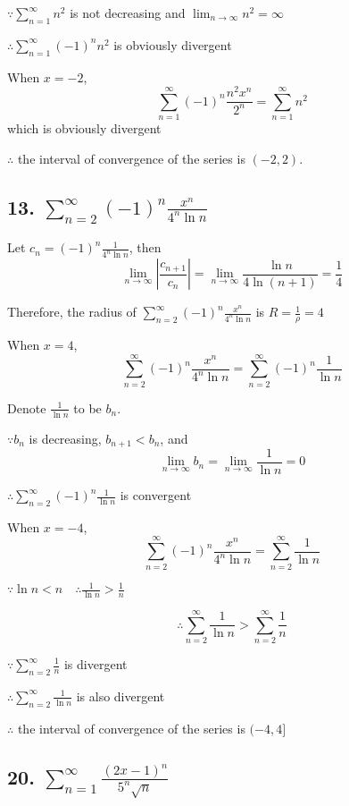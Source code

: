 \documentclass{article}
\begin{document}
    $\because \sum_{n=1}^\infty n^2$ is not decreasing and $\lim_{n\to\infty} n^2 = \infty$

    $\therefore \sum_{n=1}^\infty (-1)^n n^2$ is obviously divergent

    When $x = -2$, $$\sum_{n=1}^\infty (-1)^n \frac{n^2 x^n}{2^n} = \sum_{n=1}^\infty n^2$$ which is obviously divergent

    $\therefore$ the interval of convergence of the series is $(-2, 2)$.

    \subsection*{13. $\sum_{n=2}^\infty (-1)^n \frac{x^n}{4^n \ln n}$}

    Let $c_n = (-1)^n \frac{1}{4^n \ln n}$, then $$\lim_{n\to\infty}| \frac{c_{n+1}}{c_n} | = \lim_{n\to\infty} \frac{\ln n}{4\ln(n+1)} = \frac 1 4$$

    Therefore, the radius of $\sum_{n=2}^\infty (-1)^n \frac{x^n}{4^n \ln n}$ is $R = \frac{1}{\rho} = 4$

    When $x = 4$, $$\sum_{n=2}^\infty (-1)^n \frac{x^n}{4^n \ln n} = \sum_{n=2}^\infty (-1)^n \frac{1}{\ln n}$$

    Denote $\frac{1}{\ln n}$ to be $b_n$.

    $\because b_n$ is decreasing, $b_{n+1} < b_n$, and $$\lim_{n\to\infty}b_n = \lim_{n\to\infty} \frac{1}{\ln n} = 0$$

    $\therefore \sum_{n=2}^\infty (-1)^n \frac{1}{\ln n}$ is convergent

    When $x=-4$, $$\sum_{n=2}^\infty (-1)^n \frac{x^n}{4^n \ln n} = \sum_{n=2}^\infty \frac{1}{\ln n}$$

    $\because \ln n < n \quad \therefore \frac{1}{\ln n} > \frac{1}{n}$

    $$\therefore \sum_{n=2}^\infty \frac{1}{\ln n} > \sum_{n=2}^\infty \frac{1}{n}$$

    $\because \sum_{n=2}^\infty \frac 1 n$ is divergent

    $\therefore \sum_{n=2}^\infty \frac{1}{\ln n}$ is also divergent

    $\therefore$ the interval of convergence of the series is $(-4, 4]$

    \subsection*{20. $\sum_{n=1}^\infty \frac{(2x-1)^n}{5^n \sqrt n}$}
\end{document}
